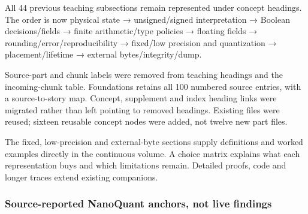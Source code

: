 All 44 previous teaching subsections remain represented under concept headings. The order is now physical state → unsigned/signed interpretation → Boolean decisions/fields → finite arithmetic/type policies → floating fields → rounding/error/reproducibility → fixed/low precision and quantization → placement/lifetime → external bytes/integrity/dump.

Source-part and chunk labels were removed from teaching headings and the incoming-chunk table. Foundations retains all 100 numbered source entries, with a source-to-story map. Concept, supplement and index heading links were migrated rather than left pointing to removed headings. Existing files were reused; sixteen reusable concept nodes were added, not twelve new part files.

The fixed, low-precision and external-byte sections supply definitions and worked examples directly in the continuous volume. A choice matrix explains what each representation buys and which limitations remain. Detailed proofs, code and longer traces extend existing companions.

\subsubsection{Source-reported NanoQuant anchors, not live findings}\label{appendix-a103e7846d21-source-reported-nanoquant-anchors-not-live-findings}


